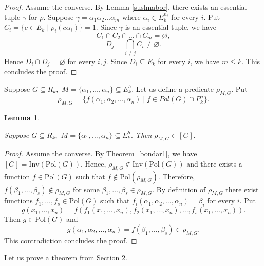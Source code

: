\documentclass{au}
\theoremstyle{plain}
\newtheorem{lemma}{Lemma}
\theoremstyle{definition}
\theoremstyle{remark}
\numberwithin{equation}{section}
\begin{document}
\begin{proof}

Assume the converse. By Lemma \ref{sushnabor},
there exists an essential tuple $\gamma$ for $\rho.$
Suppose
$\gamma = \alpha_{1}\alpha_{2}\ldots\alpha_{m}$
where $\alpha_{i}\in E_{k}^{n_{i}}$ for every $i.$
Put $C_{i} = \{c\in E_{k}\;|\; \rho_{i}(c\alpha_{i})\} = 1.$
Since $\gamma$ is an essential tuple,
we have $$C_{1}\cap C_{2}\cap \ldots \cap C_{m} = \varnothing,$$
$$D_{j} = \bigcap \limits_{i\neq j} C_{i} \neq \varnothing.$$
Hence $D_{i}\cap D_{j} = \varnothing$ for every $i,j.$
Since $D_{i}\subseteq E_{k}$ for every $i$, we have $m\le k.$
This concludes the proof.

\end{proof}

Suppose $G\subseteq R_{k},$ $M = \{\alpha_{1},\ldots,\alpha_{n}\}\subseteq E_{k}^{h}.$
Let us define a predicate $\rho_{M,G}.$
Put
$$\rho_{M,G} = \{ f(\alpha_{1},\alpha_{2},\ldots, \alpha_{n})\; |\;
f\in Pol(G)\cap P_{k}^{n}\}.$$

\begin{lemma}\label{trivialG}

Suppose $G\subseteq R_{k},$
$M = \{\alpha_{1},\ldots,\alpha_{n}\}\subseteq E_{k}^{h}.$
Then
$\rho_{M,G} \in [G].$

\end{lemma}

\begin{proof}

Assume the converse. By Theorem~\ref{bondar1},
we have 
$[G] = {
\mathrm{Inv}
}({
\mathrm{Pol}
}(G)).$
Hence, $\rho_{M,G}\notin {
\mathrm{Inv}
}({
\mathrm{Pol}
}(G))$ and there exists a function
$f\in {
\mathrm{Pol}
}(G)$ such that
$f\notin {
\mathrm{Pol}
}(\rho_{M,G}).$
Therefore,
$f(\beta_{1},\ldots,\beta_{s}) \notin \rho_{M,G}$
for some $\beta_{1},\ldots,\beta_{s} \in \rho_{M,G}.$
By definition of $\rho_{M,G}$ there exist functions
$f_{1},\ldots,f_{s}\in {
\mathrm{Pol}
}(G)$ such that
$f_{i}(\alpha_{1},\alpha_{2},\ldots, \alpha_{n}) = \beta_{i}$ for every $i.$
Put $$g(x_{1},\ldots,x_{n}) = f(f_{1}(x_{1},\ldots,x_{n}),
f_{2}(x_{1},\ldots,x_{n}),\ldots,
f_{s}(x_{1},\ldots,x_{n})).$$
Then $g\in {
\mathrm{Pol}
}(G)$ and $$g(\alpha_{1},\alpha_{2},\ldots, \alpha_{n})=
f(\beta_{1},\ldots,\beta_{s})\in \rho_{M,G}.$$
This contradiction concludes the proof.

\end{proof}

Let us prove a theorem from Section 2.
\end{document}
